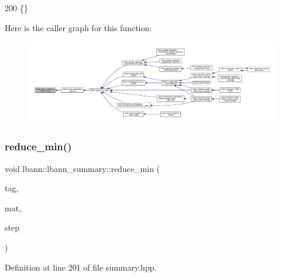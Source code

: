 \begin{DoxyCode}
200 \{\}
\end{DoxyCode}
Here is the caller graph for this function\+:\nopagebreak
\begin{figure}[H]
\begin{center}
\leavevmode
\includegraphics[width=350pt]{classlbann_1_1lbann__summary_a8f63a3f2566d5d13e5ae24e727523c44_icgraph}
\end{center}
\end{figure}
\mbox{\label{classlbann_1_1lbann__summary_afbf2df538879fcc4ea90a2bc6a6c2974}} 
\subsubsection{\texorpdfstring{reduce\+\_\+min()}{reduce\_min()}}
{\footnotesize\ttfamily void lbann\+::lbann\+\_\+summary\+::reduce\+\_\+min (\begin{DoxyParamCaption}\item[{const std\+::string}]{tag,  }\item[{const \hyperlink{base_8hpp_a9a697a504ae84010e7439ffec862b470}{Abs\+Dist\+Mat} \&}]{mat,  }\item[{int}]{step }\end{DoxyParamCaption})\hspace{0.3cm}{\ttfamily [inline]}}



Definition at line 201 of file summary.\+hpp.


